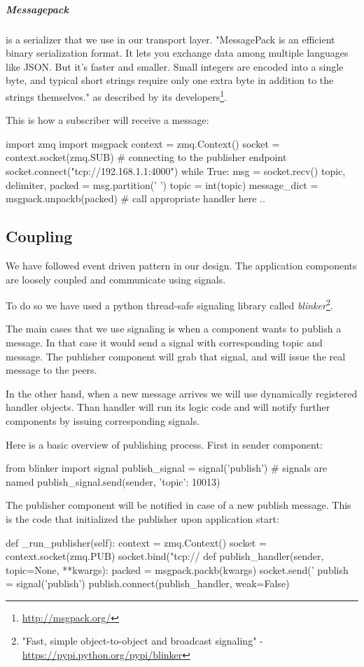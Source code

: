 \subparagraph{Messagepack} is a serializer that we use in our transport layer. 
"MessagePack is an efficient binary serialization format. 
It lets you exchange data among multiple languages like JSON.
But it's faster and smaller. 
Small integers are encoded into a single byte, 
and typical short strings require only one extra byte in addition to the strings themselves."
as described by its developers\footnote{\url{http://msgpack.org/}}.

This is how a subscriber will receive a message:
\begin{python}
import zmq
import msgpack
context = zmq.Context()
socket = context.socket(zmq.SUB)
# connecting to the publisher endpoint
socket.connect("tcp://192.168.1.1:4000")
while True:
    msg = socket.recv()
    topic, delimiter, packed = msg.partition(' ')
    topic = int(topic)
    message_dict = msgpack.unpackb(packed)
    # call appropriate handler here ..
\end{python}

\subsection{Coupling}
We have followed event driven pattern in our design.
The application components are loosely coupled and communicate using signals.

To do so we have used a python thread-safe signaling library 
called \textit{blinker}\footnote{"Fast, simple object-to-object and broadcast signaling" -
\url{https://pypi.python.org/pypi/blinker}}.

The main cases that we use signaling is when a component wants to publish a message. 
In that case it would send a signal with corresponding topic and message. 
The publisher component will grab that signal, and will issue the real message to the peers.

In the other hand, when a new message arrives we will use dynamically registered handler objects.
Than handler will run its logic code and will notify further components by issuing corresponding signals.

Here is a basic overview of publishing process. First in sender component:

\begin{python}
from blinker import signal
publish_signal = signal('publish') # signals are named
publish_signal.send(sender, {'topic': 10013})
\end{python}

The publisher component will be notified in case of a new publish message. 
This is the code that initialized the publisher upon application start:
\begin{python}
def _run_publisher(self):
    context = zmq.Context()
    socket = context.socket(zmq.PUB)
    socket.bind("tcp://%
    def publish_handler(sender, topic=None, **kwargs):
	packed = msgpack.packb(kwargs)
	socket.send('%
    publish = signal('publish')
    publish.connect(publish_handler, weak=False)
\end{python}

